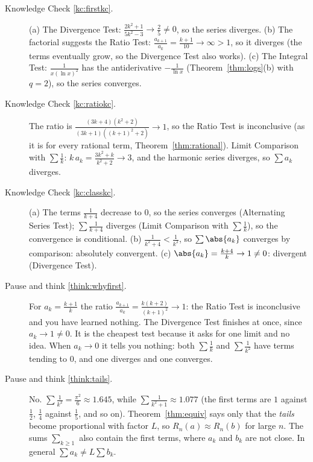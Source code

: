 \documentclass[11pt]{article}
\begin{document}
\begin{description}
  \item[Knowledge Check \ref{kc:firstkc}.] (a) The Divergence Test: $\frac{2k^2+1}{5k^2-3}\to\frac25\ne0$, so the series diverges. (b) The factorial suggests the Ratio Test: $\frac{a_{k+1}}{a_k}=\frac{k+1}{10}\to\infty>1$, so it diverges (the terms eventually grow, so the Divergence Test also works). (c) The Integral Test: $\frac1{x(\ln x)^2}$ has the antiderivative $-\frac1{\ln x}$ (Theorem~\ref{thm:logs}(b) with $q=2$), so the series converges.
  \item[Knowledge Check \ref{kc:ratiokc}.] The ratio is $\frac{(3k+4)(k^2+2)}{(3k+1)\left((k+1)^2+2\right)}\to1$, so the Ratio Test is inconclusive (as it is for every rational term, Theorem~\ref{thm:rational}). Limit Comparison with $\sum\frac1k$: $k\,a_k=\frac{3k^2+k}{k^2+2}\to3$, and the harmonic series diverges, so $\sum a_k$ diverges.
  \item[Knowledge Check \ref{kc:classkc}.] (a) The terms $\frac1{k+4}$ decrease to $0$, so the series converges (Alternating Series Test); $\sum\frac1{k+4}$ diverges (Limit Comparison with $\sum\frac1k$), so the convergence is conditional. (b) $\frac1{k^2+4}<\frac1{k^2}$, so $\sum\abs{a_k}$ converges by comparison: absolutely convergent. (c) $\abs{a_k}=\frac{k+4}k\to1\ne0$: divergent (Divergence Test).
  \item[Pause and think \ref{think:whyfirst}.] For $a_k=\frac{k+1}k$ the ratio $\frac{a_{k+1}}{a_k}=\frac{k(k+2)}{(k+1)^2}\to1$: the Ratio Test is inconclusive and you have learned nothing. The Divergence Test finishes at once, since $a_k\to1\ne0$. It is the cheapest test because it asks for one limit and no idea. When $a_k\to0$ it tells you nothing: both $\sum\frac1k$ and $\sum\frac1{k^2}$ have terms tending to $0$, and one diverges and one converges.
  \item[Pause and think \ref{think:tails}.] No. $\sum\frac1{k^2}=\frac{\pi^2}6\approx1.645$, while $\sum\frac1{k^2+1}\approx1.077$ (the first terms are $1$ against $\frac12$, $\frac14$ against $\frac15$, and so on). Theorem~\ref{thm:equiv} says only that the \emph{tails} become proportional with factor $L$, so $R_n(a)\approx R_n(b)$ for large $n$. The sums $\sum_{k\ge1}$ also contain the first terms, where $a_k$ and $b_k$ are not close. In general $\sum a_k\ne L\sum b_k$.

\end{description}
\end{document}
